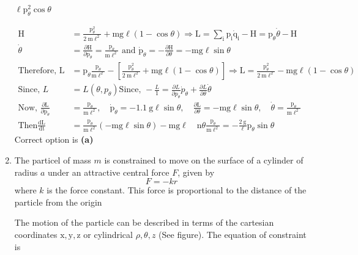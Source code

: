 \begin{enumerate}
\begin{tasks}
		\task[\textbf{d.}] $\ell \mathrm{p}_{\theta}^{2} \cos \theta$
	\end{tasks}
	\begin{answer}
		\begin{align*}
		\mathrm{H}&=\frac{\mathrm{p}_{\theta}^{2}}{2 \mathrm{~m} \ell^{2}}+\mathrm{mg} \ell(1-\cos \theta) \Rightarrow \mathrm{L}=\sum_{\mathrm{i}} \mathrm{p}_{\mathrm{i}} \dot{\mathrm{q}}_{\mathrm{i}}-\mathrm{H}=\mathrm{p}_{\theta} \dot{\theta}-\mathrm{H}\\
		\dot{\theta}&=\frac{\partial \mathrm{H}}{\partial \mathrm{p}_{\theta}}=\frac{\mathrm{p}_{\theta}}{\mathrm{m} \ell^{2}}\text{ and }\dot{\mathrm{p}}_{\theta}=-\frac{\partial \mathrm{H}}{\partial \theta}=-\mathrm{mg} \ell \sin \theta\\
		\text{Therefore, }\mathrm{L}&=\mathrm{p}_{\theta} \frac{\mathrm{p}_{\theta}}{\mathrm{m} \ell^{2}}-\left[\frac{\mathrm{p}_{\theta}^{2}}{2 \mathrm{~m} \ell^{2}}+\mathrm{mg} \ell(1-\cos \theta)\right] \Rightarrow \mathrm{L}=\frac{\mathrm{p}_{\theta}^{2}}{2 \mathrm{~m} \ell^{2}}-\mathrm{mg} \ell(1-\cos \theta)\\
		\text{Since, }L&=L\left(\theta, p_{\theta}\right)\text{Since, }
		 -\frac{L}{1}=\frac{\partial L}{\partial p_{\theta}} \dot{p}_{\theta}+\frac{\partial L}{\partial \theta} \dot{\theta}\\
		 \text{Now, }\frac{\partial \mathrm{L}}{\partial \mathrm{p}_{\theta}}&=\frac{\mathrm{p}_{\theta}}{\mathrm{m} \ell^{2}}, \quad \dot{\mathrm{p}}_{\theta}=-1.1 \mathrm{~g} \ell \sin \theta, \quad \frac{\partial \mathrm{L}}{\partial \theta}=-\mathrm{mg} \ell \sin \theta, \quad \dot{\theta}=\frac{\mathrm{p}_{\theta}}{\mathrm{m} \ell^{2}} \\
		 \text{Then} \frac{\mathrm{dL}}{\mathrm{dt}}&=\frac{\mathrm{p}_{\theta}}{\mathrm{m} \ell^{2}}(-\mathrm{mg} \ell \sin \theta)-\mathrm{mg} \ell \quad \mathrm{n} \theta \frac{\mathrm{p}_{\theta}}{\mathrm{m} \ell^{2}}=-\frac{2 \mathrm{~g}}{\ell} \mathrm{p}_{\theta} \sin \theta
		\end{align*}
		Correct option is \textbf{(a)}
	\end{answer}
	\item The particel of mass $m$ is constrained to move on the surface of a cylinder of radius $a$ under an attractive central force $F$, given by
	$$
	F=-k r
	$$
	where $k$ is the force constant. This force is proportional to the distance of the particle from the origin
\begin{answer}
		The motion of the particle can be described in terms of the cartesian coordinates $\mathrm{x}, \mathrm{y}, \mathrm{z}$ or cylindrical $\rho, \theta, z$ (See figure). The equation of constraint is

\end{answer}
\end{enumerate}
